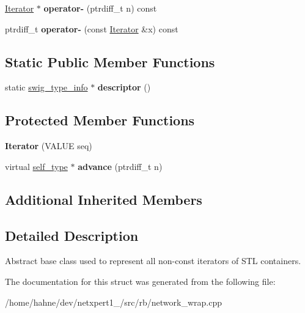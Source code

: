 \begin{DoxyCompactItemize}
\item 
\hyperlink{structswig_1_1Iterator}{Iterator} $\ast$ {\bfseries operator-\/} (ptrdiff\+\_\+t n) const \hypertarget{structswig_1_1Iterator_a877aa85388ebc02ae7e7c94e38b8c2be}{}\label{structswig_1_1Iterator_a877aa85388ebc02ae7e7c94e38b8c2be}

\item 
ptrdiff\+\_\+t {\bfseries operator-\/} (const \hyperlink{structswig_1_1Iterator}{Iterator} \&x) const \hypertarget{structswig_1_1Iterator_adc177adc84d99744a4e428cf08cdcacd}{}\label{structswig_1_1Iterator_adc177adc84d99744a4e428cf08cdcacd}

\end{DoxyCompactItemize}
\subsection*{Static Public Member Functions}
\begin{DoxyCompactItemize}
\item 
static \hyperlink{structswig__type__info}{swig\+\_\+type\+\_\+info} $\ast$ {\bfseries descriptor} ()\hypertarget{structswig_1_1Iterator_adecfcc720a12c7d384c1d3471594988a}{}\label{structswig_1_1Iterator_adecfcc720a12c7d384c1d3471594988a}

\end{DoxyCompactItemize}
\subsection*{Protected Member Functions}
\begin{DoxyCompactItemize}
\item 
{\bfseries Iterator} (V\+A\+L\+UE seq)\hypertarget{structswig_1_1Iterator_a3acd7651e68180464efdcfad10952852}{}\label{structswig_1_1Iterator_a3acd7651e68180464efdcfad10952852}

\item 
virtual \hyperlink{structswig_1_1ConstIterator}{self\+\_\+type} $\ast$ {\bfseries advance} (ptrdiff\+\_\+t n)\hypertarget{structswig_1_1Iterator_a7df3698d396e61b5ec0e93d3f109f970}{}\label{structswig_1_1Iterator_a7df3698d396e61b5ec0e93d3f109f970}

\end{DoxyCompactItemize}
\subsection*{Additional Inherited Members}


\subsection{Detailed Description}
Abstract base class used to represent all non-\/const iterators of S\+TL containers. 

The documentation for this struct was generated from the following file\+:\begin{DoxyCompactItemize}
\item 
/home/hahne/dev/netxpert1\+\_/src/rb/network\+\_\+wrap.\+cpp\end{DoxyCompactItemize}
